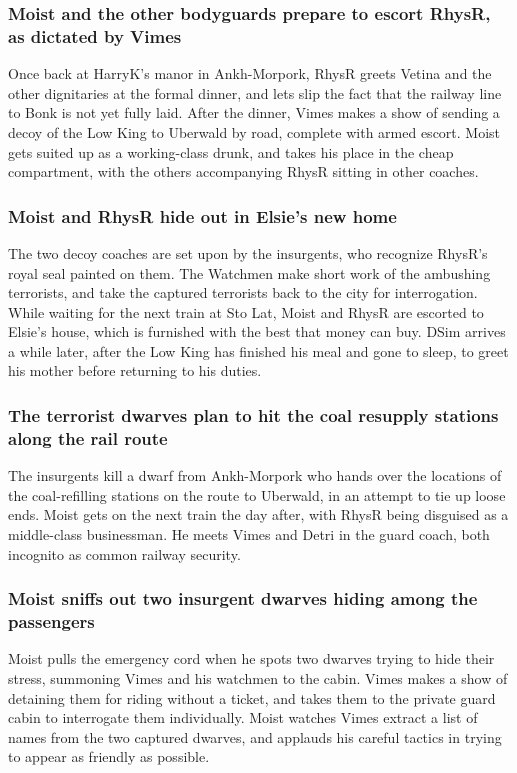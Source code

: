 \subsubsection{\Gls{Moist} and the other bodyguards prepare to escort \Gls{RhysR}, as dictated
    by \Gls{Vimes}}
Once back at \Gls{HarryK}'s manor in Ankh-Morpork, \Gls{RhysR} greets \Gls{Vetina} and the other
dignitaries at the formal dinner, and lets slip the fact that the railway line to Bonk is not yet
fully laid. After the dinner, \Gls{Vimes} makes a show of sending a decoy of the Low King to
Uberwald by road, complete with armed escort. \Gls{Moist} gets suited up as a working-class drunk,
and takes his place in the cheap compartment, with the others accompanying \Gls{RhysR} sitting in
other coaches.

\subsubsection{\Gls{Moist} and \Gls{RhysR} hide out in \Gls{Elsie}'s new home}
The two decoy coaches are set upon by the insurgents, who recognize \Gls{RhysR}'s royal seal painted
on them. The Watchmen make short work of the ambushing terrorists, and take the captured terrorists
back to the city for interrogation. While waiting for the next train at Sto Lat, \Gls{Moist} and
\Gls{RhysR} are escorted to \Gls{Elsie}'s house, which is furnished with the best that money can
buy. \Gls{DSim} arrives a while later, after the Low King has finished his meal and gone to sleep,
to greet his mother before returning to his duties.

\subsubsection{The terrorist dwarves plan to hit the coal resupply stations along the rail route}
The insurgents kill a dwarf from Ankh-Morpork who hands over the locations of the coal-refilling
stations on the route to Uberwald, in an attempt to tie up loose ends. \Gls{Moist} gets on the next
train the day after, with \Gls{RhysR} being disguised as a middle-class businessman. He meets
\Gls{Vimes} and \Gls{Detri} in the guard coach, both incognito as common railway security.

\subsubsection{\Gls{Moist} sniffs out two insurgent dwarves hiding among the passengers}
\Gls{Moist} pulls the emergency cord when he spots two dwarves trying to hide their stress,
summoning \Gls{Vimes} and his watchmen to the cabin. \Gls{Vimes} makes a show of detaining them for
riding without a ticket, and takes them to the private guard cabin to interrogate them individually.
\Gls{Moist} watches \Gls{Vimes} extract a list of names from the two captured dwarves, and applauds
his careful tactics in trying to appear as friendly as possible.

